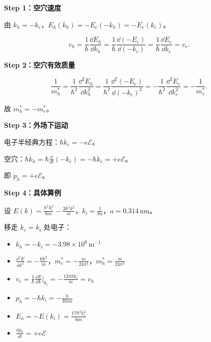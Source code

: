 \begin{derivationbox}
\textbf{Step 1：空穴速度}

由 $k_h=-k_e$，$E_h(k_h)=-E_e(-k_h)=-E_e(k_e)$。

\[
v_h=\frac{1}{\hbar}\frac{\dd E_h}{\dd k_h}=\frac{1}{\hbar}\frac{\dd(-E_e)}{\dd(-k_e)}=\frac{1}{\hbar}\frac{\dd E_e}{\dd k_e}=v_e.
\]

\textbf{Step 2：空穴有效质量}

\[
\frac{1}{m_h^*}=\frac{1}{\hbar^2}\frac{\dd^2E_h}{\dd k_h^2}
=\frac{1}{\hbar^2}\frac{\dd^2(-E_e)}{\dd(-k_e)^2}
=-\frac{1}{\hbar^2}\frac{\dd^2E_e}{\dd k_e^2}
=-\frac{1}{m_e^*}.
\]

故 $m_h^*=-m_e^*$。

\textbf{Step 3：外场下运动}

电子半经典方程：$\hbar\dot{k}_e=-e\mathcal{E}$。

空穴：$\hbar\dot{k}_h=\hbar\frac{\dd}{\dd t}(-k_e)=-\hbar\dot{k}_e=+e\mathcal{E}$。

即 $\dot{p}_h=+e\mathcal{E}$。

\textbf{Step 4：具体算例}

设 $E(k)=\frac{\hbar^2k_i^2}{6m}-\frac{3\hbar^2k^2}{m}$，$k_i=\frac{1}{8a}$，$a=0.314\,\text{nm}$。

移走 $k_e=k_i$ 处电子：
\begin{itemize}[nosep]
    \item $k_h=-k_i=-3.98\times10^8\,\text{m}^{-1}$
    \item $\frac{\dd^2E}{\dd k^2}=-\frac{6\hbar^2}{m}$，$m_e^*=-\frac{m}{24\pi^2}$，$m_h^*=\frac{m}{24\pi^2}$
    \item $v_e=\frac{1}{\hbar}\frac{\dd E}{\dd k}\big|_{k_i}=-\frac{12\pi\hbar k_i}{m}=v_h$
    \item $p_h=-\hbar k_i=-\frac{h}{16\pi a}$
    \item $E_h=-E(k_i)=\frac{17\hbar^2k_i^2}{6m}$
    \item $\frac{\dd p_h}{\dd t}=+e\mathcal{E}$
\end{itemize}
\end{derivationbox}

\vspace{1em}
